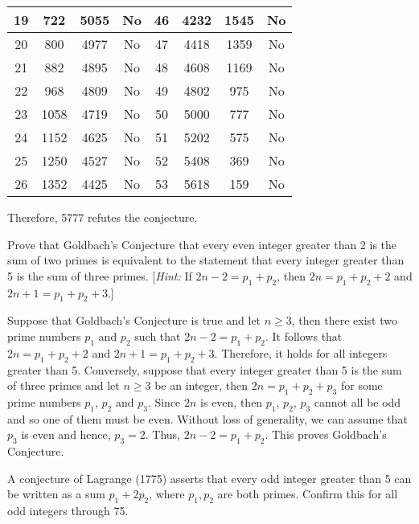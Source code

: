 \begin{solution}
\begin{center}
\begin{tabular}{ |c|c|c|c|c|c|c|c| }
        \hline 19 & 722 & 5055 & No & 46 & 4232 & 1545 & No \\
        \hline 20 & 800 & 4977 & No & 47 & 4418 & 1359 & No \\
        \hline 21 & 882 & 4895 & No & 48 & 4608 & 1169 & No \\
        \hline 22 & 968 & 4809 & No & 49 & 4802 & 975 & No \\
        \hline 23 & 1058 & 4719 & No & 50 & 5000 & 777 & No \\
        \hline 24 & 1152 & 4625 & No & 51 & 5202 & 575 & No \\
        \hline 25 & 1250 & 4527 & No & 52 & 5408 & 369 & No \\
        \hline 26 & 1352 & 4425 & No & 53 & 5618 & 159 & No \\
        \hline
    \end{tabular}
    \end{center}
    Therefore, 5777 refutes the conjecture. \\
\end{solution}

\begin{exercise}
    Prove that Goldbach's Conjecture that every even integer greater than 2 is the sum of two primes is equivalent to the statement that every integer greater than 5 is the sum of three primes. [\textit{Hint:} If $2n-2 = p_1 + p_2$, then $2n = p_1 + p_2 + 2$ and $2n + 1 = p_1 + p_2 + 3$.] \\
\end{exercise}

\begin{solution}
    Suppose that Goldbach's Conjecture is true and let $n \geq 3$, then there exist two prime numbers $p_1$ and $p_2$ such that $2n - 2 = p_1 + p_2$. It follows that $2n = p_1 + p_2 + 2$ and $2n + 1 = p_1 + p_2 + 3$. Therefore, it holds for all integers greater than 5. Conversely, suppose that every integer greater than 5 is the sum of three primes and let $n \geq 3$ be an integer, then $2n = p_1 + p_2 + p_3$ for some prime numbers $p_1$, $p_2$ and $p_3$. Since $2n$ is even, then $p_1$, $p_2$, $p_3$ cannot all be odd and so one of them must be even. Without loss of generality, we can assume that $p_3$ is even and hence, $p_3 = 2$. Thus, $2n - 2 = p_1 + p_2$. This proves Goldbach's Conjecture.\\
\end{solution}

\begin{exercise}
    A conjecture of Lagrange (1775) asserts that every odd integer greater than 5 can be written as a sum $p_1 + 2p_2$, where $p_1,p_2$ are both primes. Confirm this for all odd integers through 75. \\
\end{exercise}

